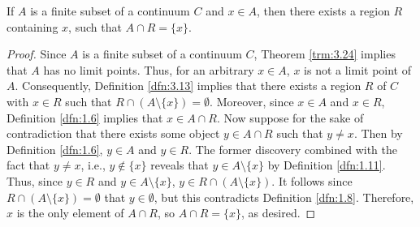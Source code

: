 \documentclass[../main.tex]{subfiles}
\begin{document}
\begin{corollary}\label{cly:3.25}
    If $A$ is a finite subset of a continuum $C$ and $x\in A$, then there exists a region $R$ containing $x$, such that $A\cap R=\{x\}$.
    \begin{proof}
        Since $A$ is a finite subset of a continuum $C$, Theorem \ref{trm:3.24} implies that $A$ has no limit points. Thus, for an arbitrary $x\in A$, $x$ is not a limit point of $A$. Consequently, Definition \ref{dfn:3.13} implies that there exists a region $R$ of $C$ with $x\in R$ such that $R\cap(A\setminus\{x\})=\emptyset$. Moreover, since $x\in A$ and $x\in R$, Definition \ref{dfn:1.6} implies that $x\in A\cap R$. Now suppose for the sake of contradiction that there exists some object $y\in A\cap R$ such that $y\neq x$. Then by Definition \ref{dfn:1.6}, $y\in A$ and $y\in R$. The former discovery combined with the fact that $y\neq x$, i.e., $y\notin\{x\}$ reveals that $y\in A\setminus\{x\}$ by Definition \ref{dfn:1.11}. Thus, since $y\in R$ and $y\in A\setminus\{x\}$, $y\in R\cap(A\setminus\{x\})$. It follows since $R\cap(A\setminus\{x\})=\emptyset$ that $y\in\emptyset$, but this contradicts Definition \ref{dfn:1.8}. Therefore, $x$ is the only element of $A\cap R$, so $A\cap R=\{x\}$, as desired.
    \end{proof}
\end{corollary}
\end{document}
